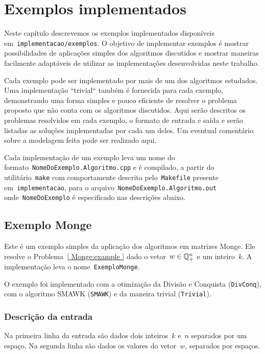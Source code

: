 \chapter{Exemplos implementados}
\label{Exemplos}

Neste capítulo descrevemos os exemplos implementados disponíveis em~\texttt{implementacao/exemplos}. O objetivo de implementar exemplos é mostrar possibilidades de aplicações simples dos algoritmos discutidos e mostrar maneiras facilmente adaptáveis de utilizar as implementações desenvolvidas neste trabalho.

Cada exemplo pode ser implementado por mais de um dos algoritmos estudados. Uma implementação ``trivial`` também é fornecida para cada exemplo, demonstrando uma forma simples e pouco eficiente de resolver o problema proposto que não conta com os algoritmos discutidos. Aqui serão descritos os problemas resolvidos em cada exemplo, o formato de entrada e saída e serão listadas as soluções implementadas por cada um deles. Um eventual comentário sobre a modelagem feita pode ser realizado aqui.

Cada implementação de um exemplo leva um nome do formato~\texttt{NomeDoExemplo.Algoritmo.cpp} e é compilado, a partir do utilitário~\texttt{make} com comportamente descrito pelo~\texttt{Makefile} presente em~\texttt{implementacao}, para o arquivo~\texttt{NomeDoExemplo.Algoritmo.out} onde~\texttt{NomeDoExemplo} é especificado nas descrições abaixo.


\section{Exemplo Monge} \label{ExemploMonge}

Este é um exemplo simples da aplicação dos algoritmos em matrizes Monge. Ele resolve o Problema~\ref{ Monge:example } dado o vetor~$w \in \mathbb{Q}^{n}_+$ e um inteiro~$k$. A implementação leva o nome~\texttt{ExemploMonge}.

O exemplo foi implementado com a otimização da Divisão e Conquista (\texttt{DivConq}), com o algoritmo SMAWK (\texttt{SMAWK}) e da maneira trivial (\texttt{Trivial}).

\subsection{Descrição da entrada}
Na primeira linha da entrada são dados dois inteiros~$k$ e~$n$ separados por um espaço. Na segunda linha são dados os valores do vetor~$w$, separados por espaços.

